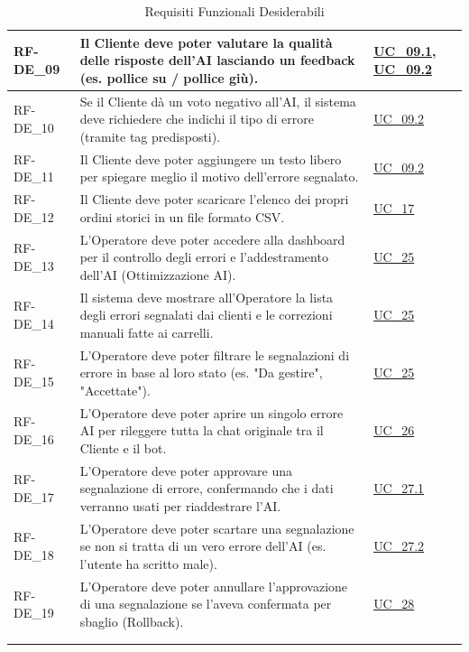 \begin{longtable}{|>{\raggedright}p{}|>{\raggedright\arraybackslash}p{}|>{\raggedright\arraybackslash}p{}|}
    \hline
    RF-DE\_09 \hypertarget{rf-de_9} & Il Cliente deve poter valutare la qualità delle risposte dell'AI lasciando un feedback (es. pollice su / pollice giù). & \hyperref[uc_09.1]{UC\_09.1}, \hyperref[uc_09.2]{UC\_09.2} \\
    \hline
    RF-DE\_10 \hypertarget{rf-de_10} & Se il Cliente dà un voto negativo all'AI, il sistema deve richiedere che indichi il tipo di errore (tramite tag predisposti). & \hyperref[uc_09.2]{UC\_09.2} \\
    \hline
    RF-DE\_11 \hypertarget{rf-de_11} & Il Cliente deve poter aggiungere un testo libero per spiegare meglio il motivo dell'errore segnalato. & \hyperref[uc_09.2]{UC\_09.2} \\
    \hline
    RF-DE\_12 \hypertarget{rf-de_12} & Il Cliente deve poter scaricare l'elenco dei propri ordini storici in un file formato CSV. & \hyperref[uc_17]{UC\_17} \\
    \hline
    RF-DE\_13 \hypertarget{rf-de_13} & L'Operatore deve poter accedere alla dashboard per il controllo degli errori e l'addestramento dell'AI (Ottimizzazione AI). & \hyperref[uc_25]{UC\_25} \\
    \hline
    RF-DE\_14 \hypertarget{rf-de_14} & Il sistema deve mostrare all'Operatore la lista degli errori segnalati dai clienti e le correzioni manuali fatte ai carrelli. & \hyperref[uc_25]{UC\_25} \\
    \hline
    RF-DE\_15 \hypertarget{rf-de_15} & L'Operatore deve poter filtrare le segnalazioni di errore in base al loro stato (es. "Da gestire", "Accettate"). & \hyperref[uc_25]{UC\_25} \\
    \hline
    RF-DE\_16 \hypertarget{rf-de_16} & L'Operatore deve poter aprire un singolo errore AI per rileggere tutta la chat originale tra il Cliente e il bot. & \hyperref[uc_26]{UC\_26} \\
    \hline
    RF-DE\_17 \hypertarget{rf-de_17} & L'Operatore deve poter approvare una segnalazione di errore, confermando che i dati verranno usati per riaddestrare l'AI. & \hyperref[uc_27.1]{UC\_27.1} \\
    \hline
    RF-DE\_18 \hypertarget{rf-de_18} & L'Operatore deve poter scartare una segnalazione se non si tratta di un vero errore dell'AI (es. l'utente ha scritto male). & \hyperref[uc_27.2]{UC\_27.2} \\
    \hline
    RF-DE\_19 \hypertarget{rf-de_19} & L'Operatore deve poter annullare l'approvazione di una segnalazione se l'aveva confermata per sbaglio (Rollback). & \hyperref[uc_28]{UC\_28} \\
    \hline
    \multicolumn{3}{c}{} \\
    \caption{Requisiti Funzionali Desiderabili}\hypertarget{tab:funzionali_desiderabili}\\
\end{longtable}

